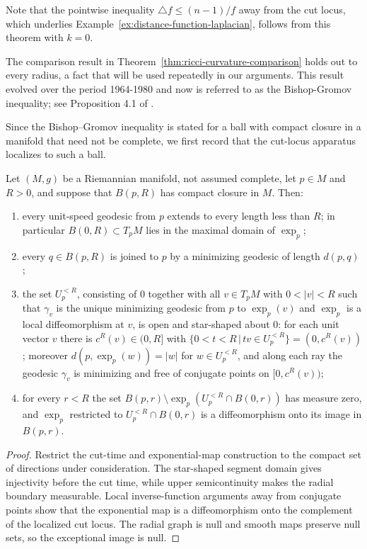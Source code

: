 Note that the pointwise inequality $\triangle f\le(n-1)/f$ away
from the cut locus, which underlies
Example~\ref{ex:distance-function-laplacian}, follows from this
theorem with $k=0$.

The comparison result in Theorem~\ref{thm:ricci-curvature-comparison} holds out to
every radius, a fact that will be used repeatedly in our arguments.
This result evolved over the period 1964-1980 and now is referred to
as the Bishop-Gromov inequality; see
Proposition 4.1 of \cite{CheegerGromovTaylor}.

Since the Bishop--Gromov inequality is stated for a ball with
compact closure in a manifold that need not be complete, we first
record that the cut-locus apparatus localizes to such a ball.

\begin{lemma}
\label{lem:localized-cut-locus}

Let $(M,g)$ be a Riemannian manifold, not assumed complete, let
$p\in M$ and $R>0$, and suppose that $B(p,R)$ has compact closure
in $M$. Then:
\begin{enumerate}
\item every unit-speed geodesic from $p$ extends to every length
less than $R$; in particular
$B(0,R)\subset T_pM$ lies in the maximal domain of $\exp_p$;
\item every $q\in B(p,R)$ is joined to $p$ by a minimizing geodesic
of length $d(p,q)$;
\item the set $U_p^{<R}$, consisting of $0$ together with all $v\in
T_pM$ with $0<|v|<R$ such that $\gamma_v$ is the unique minimizing
geodesic from $p$ to $\exp_p(v)$ and $\exp_p$ is a local
diffeomorphism at $v$, is open and star-shaped about $0$: for each
unit vector $v$ there is $c^R(v)\in(0,R]$ with $\{0<t<R\,|\,tv\in
U_p^{<R}\}=(0,c^R(v))$; moreover $d(p,\exp_p(w))=|w|$ for $w\in
U_p^{<R}$, and along each ray the geodesic $\gamma_v$ is minimizing
and free of conjugate points on $[0,c^R(v))$;
\item for every $r<R$ the set $B(p,r)\setminus
\exp_p\left(U_p^{<R}\cap B(0,r)\right)$ has measure zero, and
$\exp_p$ restricted to $U_p^{<R}\cap B(0,r)$ is a
diffeomorphism onto its image in $B(p,r)$.
\end{enumerate}
\end{lemma}

\begin{proof}
\sketch
{}
Restrict the cut-time and exponential-map construction to the compact set of directions under consideration. The star-shaped segment domain gives injectivity before the cut time, while upper semicontinuity makes the radial boundary measurable. Local inverse-function arguments away from conjugate points show that the exponential map is a diffeomorphism onto the complement of the localized cut locus. The radial graph is null and smooth maps preserve null sets, so the exceptional image is null.
\end{proof}


